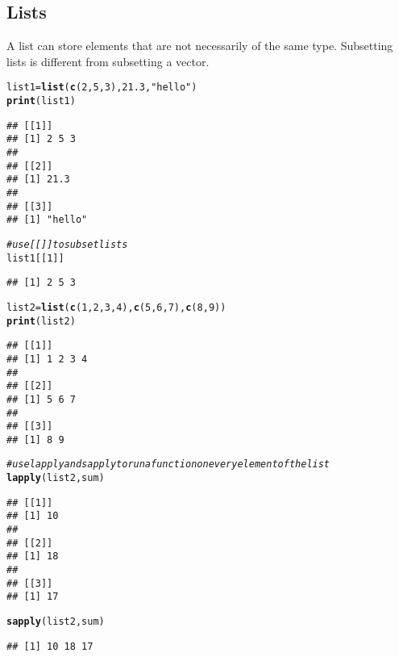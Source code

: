 \documentclass[12pt]{article}\usepackage[]{graphicx}\usepackage[]{color}
\makeatletter
\newcommand{\hlnum}[1]{\textcolor[rgb]{0.686,0.059,0.569}{#1}}%
\newcommand{\hlstr}[1]{\textcolor[rgb]{0.192,0.494,0.8}{#1}}%
\newcommand{\hlcom}[1]{\textcolor[rgb]{0.678,0.584,0.686}{\textit{#1}}}%
\newcommand{\hlstd}[1]{\textcolor[rgb]{0.345,0.345,0.345}{#1}}%
\newcommand{\hlkwb}[1]{\textcolor[rgb]{0.69,0.353,0.396}{#1}}%
\newcommand{\hlkwd}[1]{\textcolor[rgb]{0.737,0.353,0.396}{\textbf{#1}}}%
\newenvironment{kframe}{%
 \def\at@end@of@kframe{}%
 \ifinner\ifhmode%
  \def\at@end@of@kframe{\end{minipage}}%
  \begin{minipage}{\columnwidth}%
 \fi\fi%
 \def\FrameCommand##1{\hskip\@totalleftmargin \hskip-\fboxsep
 \colorbox{shadecolor}{##1}\hskip-\fboxsep
     \hskip-\linewidth \hskip-\@totalleftmargin \hskip\columnwidth}%
 \MakeFramed {\advance\hsize-\width
   \@totalleftmargin\z@ \linewidth\hsize
   \@setminipage}}%
 {\par\unskip\endMakeFramed%
 \at@end@of@kframe}
\newenvironment{knitrout}{}{} %
\makeatother
\begin{document}
\subsection{Lists}
A list can store elements that are not necessarily of the same type. Subsetting lists is different from subsetting a vector.
\begin{knitrout}
\color{fgcolor}\begin{kframe}
\begin{alltt}
\hlstd{list1} \hlkwb{=} \hlkwd{list}\hlstd{(}\hlkwd{c}\hlstd{(}\hlnum{2}\hlstd{,}\hlnum{5}\hlstd{,}\hlnum{3}\hlstd{),}\hlnum{21.3}\hlstd{,}\hlstr{"hello"}\hlstd{)}
\hlkwd{print}\hlstd{(list1)}
\end{alltt}
\begin{verbatim}
## [[1]]
## [1] 2 5 3
## 
## [[2]]
## [1] 21.3
## 
## [[3]]
## [1] "hello"
\end{verbatim}
\begin{alltt}
\hlcom{# use [[]] to subset lists}
\hlstd{list1[[}\hlnum{1}\hlstd{]]}
\end{alltt}
\begin{verbatim}
## [1] 2 5 3
\end{verbatim}
\begin{alltt}
\hlstd{list2} \hlkwb{=} \hlkwd{list}\hlstd{(}\hlkwd{c}\hlstd{(}\hlnum{1}\hlstd{,}\hlnum{2}\hlstd{,}\hlnum{3}\hlstd{,}\hlnum{4}\hlstd{),}\hlkwd{c}\hlstd{(}\hlnum{5}\hlstd{,}\hlnum{6}\hlstd{,}\hlnum{7}\hlstd{),}\hlkwd{c}\hlstd{(}\hlnum{8}\hlstd{,}\hlnum{9}\hlstd{))}
\hlkwd{print}\hlstd{(list2)}
\end{alltt}
\begin{verbatim}
## [[1]]
## [1] 1 2 3 4
## 
## [[2]]
## [1] 5 6 7
## 
## [[3]]
## [1] 8 9
\end{verbatim}
\begin{alltt}
\hlcom{# use lapply and sapply to run a function on every element of the list}
\hlkwd{lapply}\hlstd{(list2,sum)}
\end{alltt}
\begin{verbatim}
## [[1]]
## [1] 10
## 
## [[2]]
## [1] 18
## 
## [[3]]
## [1] 17
\end{verbatim}
\begin{alltt}
\hlkwd{sapply}\hlstd{(list2,sum)}
\end{alltt}
\begin{verbatim}
## [1] 10 18 17
\end{verbatim}
\end{kframe}
\end{knitrout}
\end{document}
